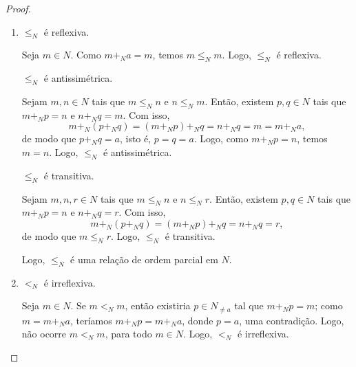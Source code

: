 \begin{proof}
    \leavevmode
        \begin{enumerate}[leftmargin=*, align=left, label=\textbf{(\alph*)}]
            \item 
                \begin{claim}
                    ${\leq_N}$ é reflexiva.
                \end{claim}
                \begin{midproof}
                    Seja $m \in N$. Como $m +_N a = m$, temos $m \leq_N m$. Logo, ${\leq_N}$ é reflexiva. \whiteproof
                \end{midproof}
                \begin{claim}
                    ${\leq_N}$ é antissimétrica.
                \end{claim}
                \begin{midproof}
                    Sejam $m,n \in N$ tais que $m \leq_N n$ e $n \leq_N m$. Então, existem $p,q \in N$ tais que $m +_N p = n$ e $n +_N q = m$. Com isso,
                        \[
                            m +_N (p +_N q) = (m +_N p) +_N q = n +_N q = m = m +_N a,
                        \]
                    de modo que $p +_N q = a$, isto é, $p=q=a$. Logo, como $m +_N p = n$, temos $m=n$. Logo, ${\leq_N}$ é antissimétrica. \whiteproof
                \end{midproof}
                \begin{claim}
                    ${\leq_N}$ é transitiva.
                \end{claim}
                \begin{midproof}
                    Sejam $m,n,r \in N$ tais que $m \leq_N n$ e $n \leq_N r$. Então, existem $p,q \in N$ tais que $m +_N p = n$ e $n +_N q = r$. Com isso,
                        \[
                            m +_N (p +_N q) = (m +_N p) +_N q = n +_N q = r,
                        \]
                    de modo que $m \leq_N r$. Logo, ${\leq_N}$ é transitiva. \whiteproof
                \end{midproof}
            Logo, ${\leq_N}$ é uma relação de ordem parcial em $N$. \blackproof
            \item 
                \begin{claim}
                    ${<_N}$ é irreflexiva.
                \end{claim}
                \begin{midproof}
                    Seja $m \in N$. Se $m <_N m$, então existiria $p \in N_{\neq a}$ tal que $m +_N p = m$; como $m=m+_N a$, teríamos $m +_N p = m +_N a$, donde $p=a$, uma contradição. Logo, não ocorre $m <_N m$, para todo $m \in N$. Logo, ${<_N}$ é irreflexiva. \whiteproof

\end{midproof}
\end{enumerate}
\end{proof}
